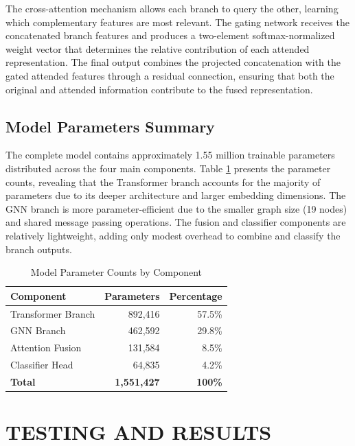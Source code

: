 The cross-attention mechanism allows each branch to query the other, learning which complementary features are most relevant. The gating network receives the concatenated branch features and produces a two-element softmax-normalized weight vector that determines the relative contribution of each attended representation. The final output combines the projected concatenation with the gated attended features through a residual connection, ensuring that both the original and attended information contribute to the fused representation.

\subsection{Model Parameters Summary}

The complete model contains approximately 1.55 million trainable parameters distributed across the four main components. Table \ref{tab:model_params} presents the parameter counts, revealing that the Transformer branch accounts for the majority of parameters due to its deeper architecture and larger embedding dimensions. The GNN branch is more parameter-efficient due to the smaller graph size (19 nodes) and shared message passing operations. The fusion and classifier components are relatively lightweight, adding only modest overhead to combine and classify the branch outputs.

\begin{table}[H]
    \centering
    \small
    \caption{Model Parameter Counts by Component}
    \label{tab:model_params}
    \begin{tabularx}{\textwidth}{|X|r|r|}
        \hline
        \textbf{Component} & \textbf{Parameters} & \textbf{Percentage} \\
        \hline
        Transformer Branch & 892,416 & 57.5\% \\
        \hline
        GNN Branch & 462,592 & 29.8\% \\
        \hline
        Attention Fusion & 131,584 & 8.5\% \\
        \hline
        Classifier Head & 64,835 & 4.2\% \\
        \hline
        \textbf{Total} & \textbf{1,551,427} & \textbf{100\%} \\
        \hline
    \end{tabularx}
\end{table}

\section{TESTING AND RESULTS}

